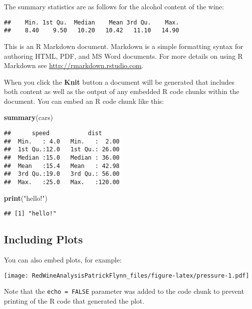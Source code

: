 \documentclass[]{article}
\newenvironment{Shaded}{\begin{snugshade}}{\end{snugshade}}
\newcommand{\KeywordTok}[1]{\textcolor[rgb]{0.13,0.29,0.53}{\textbf{#1}}}
\newcommand{\NormalTok}[1]{#1}
\newcommand{\StringTok}[1]{\textcolor[rgb]{0.31,0.60,0.02}{#1}}
\begin{document}
The summary statistics are as follows for the alcohol content of the
wine:

\begin{verbatim}
##    Min. 1st Qu.  Median    Mean 3rd Qu.    Max. 
##    8.40    9.50   10.20   10.42   11.10   14.90
\end{verbatim}

This is an R Markdown document. Markdown is a simple formatting syntax
for authoring HTML, PDF, and MS Word documents. For more details on
using R Markdown see \url{http://rmarkdown.rstudio.com}.

When you click the \textbf{Knit} button a document will be generated
that includes both content as well as the output of any embedded R code
chunks within the document. You can embed an R code chunk like this:

\begin{Shaded}
\begin{Highlighting}[]
\KeywordTok{summary}\NormalTok{(cars)}
\end{Highlighting}
\end{Shaded}

\begin{verbatim}
##      speed           dist       
##  Min.   : 4.0   Min.   :  2.00  
##  1st Qu.:12.0   1st Qu.: 26.00  
##  Median :15.0   Median : 36.00  
##  Mean   :15.4   Mean   : 42.98  
##  3rd Qu.:19.0   3rd Qu.: 56.00  
##  Max.   :25.0   Max.   :120.00
\end{verbatim}

\begin{Shaded}
\begin{Highlighting}[]
\KeywordTok{print}\NormalTok{(}\StringTok{"hello!"}\NormalTok{)}
\end{Highlighting}
\end{Shaded}

\begin{verbatim}
## [1] "hello!"
\end{verbatim}

\hypertarget{including-plots}{%
\subsection{Including Plots}\label{including-plots}}

You can also embed plots, for example:

\texttt{[image: RedWineAnalysisPatrickFlynn\_files/figure-latex/pressure-1.pdf]}

Note that the \texttt{echo\ =\ FALSE} parameter was added to the code
chunk to prevent printing of the R code that generated the plot.
\end{document}
